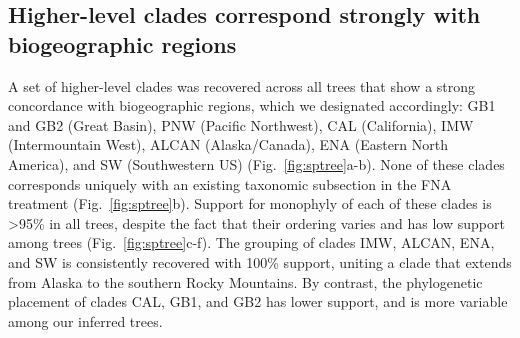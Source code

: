 \documentclass[11pt]{article}
\begin{document}
\subsection{Higher-level clades correspond strongly with biogeographic regions}
A set of higher-level clades was recovered across all trees that show a strong
concordance with biogeographic regions, which we designated accordingly: GB1 and GB2 (Great Basin), PNW (Pacific Northwest), CAL (California), IMW (Intermountain West), ALCAN (Alaska/Canada), ENA (Eastern North America), and SW (Southwestern US) (Fig.~\ref{fig:sptree}a-b). 
% 
None of these
clades corresponds uniquely with an existing taxonomic subsection in the FNA treatment (Fig.~\ref{fig:sptree}b). 
% 
Support for monophyly of each of these clades is >95\% in all trees, despite 
the fact that their ordering varies and has low support among trees
(Fig.~\ref{fig:sptree}c-f).
% 
The grouping of clades IMW, ALCAN, ENA, and SW is consistently recovered with 
100\% support, uniting a clade that extends from Alaska to the southern Rocky
Mountains. By contrast, the phylogenetic placement of clades CAL, GB1, and GB2 has lower support, and is more variable among our inferred trees. 
% 
% 
% 
% 
\end{document}
